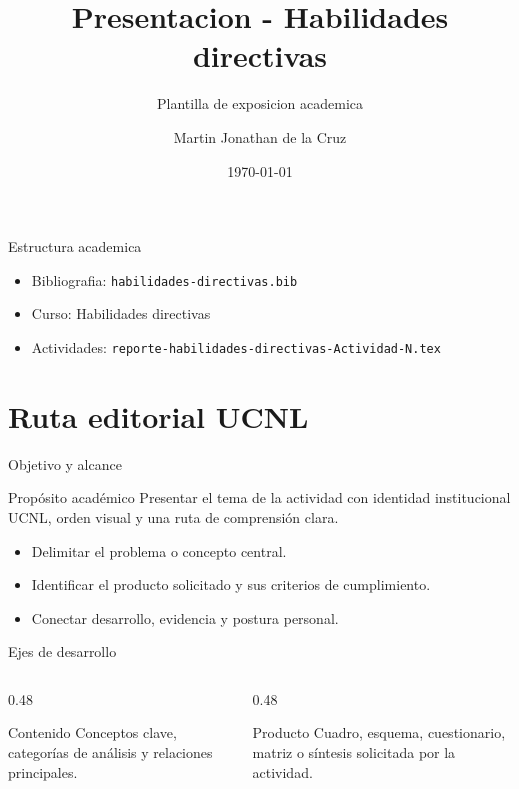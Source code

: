 ﻿\documentclass[spanish,aspectratio=169]{beamer}
\title{Presentacion - Habilidades directivas}
\subtitle{Plantilla de exposicion academica}
\author{Martin Jonathan de la Cruz}
\institute{Universidad Ciudadana de Nuevo Leon}
\date{\today}
\begin{document}
\begin{frame}
  \titlepage
\end{frame}

\begin{frame}{Estructura academica}
  \begin{itemize}
    \item Bibliografia: \texttt{habilidades-directivas.bib}
    \item Curso: Habilidades directivas
    \item Actividades: \texttt{reporte-habilidades-directivas-Actividad-N.tex}
  \end{itemize}
\end{frame}


\section{Ruta editorial UCNL}

\begin{frame}{Objetivo y alcance}
  \begin{block}{Propósito académico}
    Presentar el tema de la actividad con identidad institucional UCNL, orden visual y una ruta de comprensión clara.
  \end{block}
  \begin{itemize}
    \item Delimitar el problema o concepto central.
    \item Identificar el producto solicitado y sus criterios de cumplimiento.
    \item Conectar desarrollo, evidencia y postura personal.
  \end{itemize}
\end{frame}

\begin{frame}{Ejes de desarrollo}
  \begin{columns}[T,totalwidth=\textwidth]
    \begin{column}{0.48\textwidth}
      \begin{block}{Contenido}
        Conceptos clave, categorías de análisis y relaciones principales.
      \end{block}
    \end{column}
    \begin{column}{0.48\textwidth}
      \begin{block}{Producto}
        Cuadro, esquema, cuestionario, matriz o síntesis solicitada por la actividad.
      \end{block}
    \end{column}
  \end{columns}
\end{frame}
\end{document}
